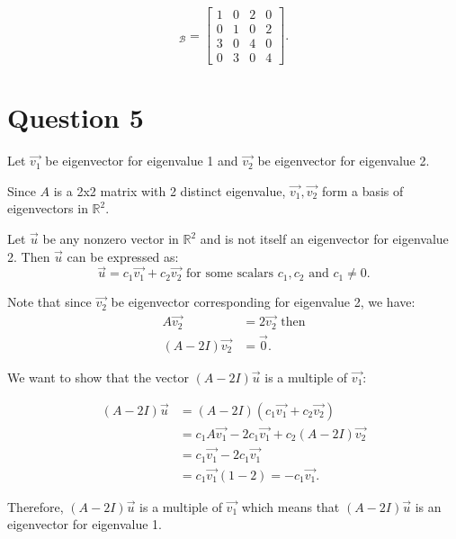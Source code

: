 \documentclass[10pt]{article}
\begin{document}
\begin{equation*}
    [T]_{\mathcal{B}} =
    \begin{bmatrix}
    1 & 0 & 2 & 0 \\
    0 & 1 & 0 & 2 \\
    3 & 0 & 4 & 0\\
    0 & 3 & 0 & 4
    \end{bmatrix}.
\end{equation*}



\section*{Question 5}
\noindent Let $\Vec{v_1}$ be eigenvector for eigenvalue 1 and $\Vec{v_2}$ be eigenvector for eigenvalue 2. \par
\noindent Since $A$ is a 2x2 matrix with 2 distinct eigenvalue, $\Vec{v_1}, \Vec{v_2}$ form a basis of eigenvectors in $\mathbb{R}^2$. \par
\noindent Let $\Vec{u}$ be any nonzero vector in $\mathbb{R}^2$ and is not itself an eigenvector for eigenvalue 2. Then $\Vec{u}$ can be expressed as:
$$\Vec{u} = c_1\Vec{v_1} + c_2\Vec{v_2} \text{ for some scalars } c_1, c_2 \text{ and } c_1\neq 0. $$

\noindent Note that since $\Vec{v_2}$ be eigenvector corresponding for eigenvalue 2, we have:
\begin{align*}
    A\Vec{v_2} &= 2\Vec{v_2} \text{ then}\\
    (A - 2I) \Vec{v_2} &= \Vec{0}.
\end{align*}

\noindent We want to show that the vector $(A - 2I)\Vec{u}$ is a multiple of $\Vec{v_1}$:

\begin{align*}
    (A - 2I)\Vec{u} &= (A - 2I)(c_1\Vec{v_1} + c_2\Vec{v_2}) \\
    &= c_1A\Vec{v_1} - 2c_1\Vec{v_1} + c_2(A- 2I)\Vec{v_2} \\
    &= c_1\Vec{v_1} - 2c_1\Vec{v_1} \\
    &= c_1\Vec{v_1}(1-2) = -c_1\Vec{v_1}.
\end{align*}

\noindent Therefore, $(A - 2I)\Vec{u}$ is a multiple of $\Vec{v_1}$ which means that $(A - 2I)\Vec{u}$ is an eigenvector for eigenvalue 1.
\end{document}
